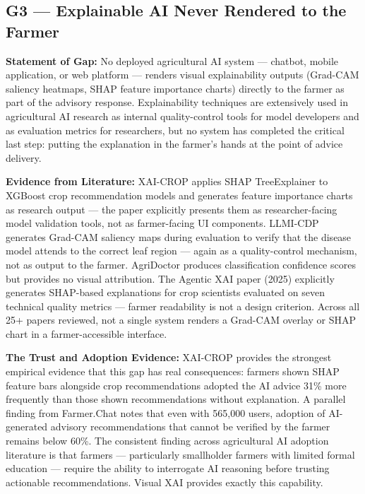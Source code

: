 \documentclass[12pt,a4paper]{article}
\begin{document}
\subsection{G3 --- Explainable AI Never Rendered to the Farmer}
\textbf{Statement of Gap:}
No deployed agricultural AI system --- chatbot, mobile application, or web platform --- renders visual explainability outputs (Grad-CAM saliency heatmaps, SHAP feature importance charts) directly to the farmer as part of the advisory response. Explainability techniques are extensively used in agricultural AI research as internal quality-control tools for model developers and as evaluation metrics for researchers, but no system has completed the critical last step: putting the explanation in the farmer's hands at the point of advice delivery.

\noindent\textbf{Evidence from Literature:}
XAI-CROP \cite{xaiCrop2024} applies SHAP TreeExplainer to XGBoost crop recommendation models and generates feature importance charts as research output --- the paper explicitly presents them as researcher-facing model validation tools, not as farmer-facing UI components. LLMI-CDP \cite{llmiCdp2025} generates Grad-CAM saliency maps during evaluation to verify that the disease model attends to the correct leaf region --- again as a quality-control mechanism, not as output to the farmer. AgriDoctor \cite{agridoctor2025} produces classification confidence scores but provides no visual attribution. The Agentic XAI paper (2025) explicitly generates SHAP-based explanations for crop scientists evaluated on seven technical quality metrics --- farmer readability is not a design criterion. Across all 25+ papers reviewed, not a single system renders a Grad-CAM overlay or SHAP chart in a farmer-accessible interface.

\noindent\textbf{The Trust and Adoption Evidence:}
XAI-CROP \cite{xaiCrop2024} provides the strongest empirical evidence that this gap has real consequences: farmers shown SHAP feature bars alongside crop recommendations adopted the AI advice 31\% more frequently than those shown recommendations without explanation. A parallel finding from Farmer.\allowbreak Chat \cite{farmerchat2024} notes that even with 565,000 users, adoption of AI-generated advisory recommendations that cannot be verified by the farmer remains below 60\%. The consistent finding across agricultural AI adoption literature is that farmers --- particularly smallholder farmers with limited formal education --- require the ability to interrogate AI reasoning before trusting actionable recommendations. Visual XAI provides exactly this capability.
\end{document}
